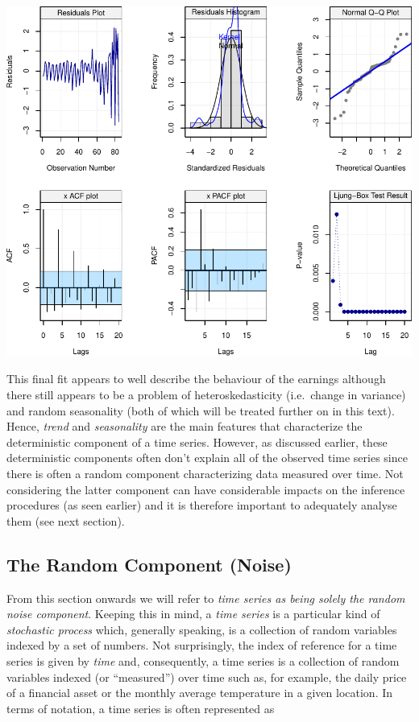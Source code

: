 \documentclass[]{book}
\theoremstyle{definition}
\theoremstyle{definition}
\theoremstyle{definition}
\theoremstyle{remark}
\begin{document}
\begin{center}\includegraphics{ts_files/figure-latex/lmresid3-1} \end{center}

This final fit appears to well describe the behaviour of the earnings
although there still appears to be a problem of heteroskedasticity
(i.e.~change in variance) and random seasonality (both of which will be
treated further on in this text). Hence, \emph{trend} and
\emph{seasonality} are the main features that characterize the
deterministic component of a time series. However, as discussed earlier,
these deterministic components often don't explain all of the observed
time series since there is often a random component characterizing data
measured over time. Not considering the latter component can have
considerable impacts on the inference procedures (as seen earlier) and
it is therefore important to adequately analyse them (see next section).

\subsection{The Random Component
(Noise)}\label{the-random-component-noise}

From this section onwards we will refer to \emph{time series as being
solely the random noise component}. Keeping this in mind, a \emph{time
series} is a particular kind of \emph{stochastic process} which,
generally speaking, is a collection of random variables indexed by a set
of numbers. Not surprisingly, the index of reference for a time series
is given by \emph{time} and, consequently, a time series is a collection
of random variables indexed (or ``measured'') over time such as, for
example, the daily price of a financial asset or the monthly average
temperature in a given location. In terms of notation, a time series is
often represented as
\end{document}
